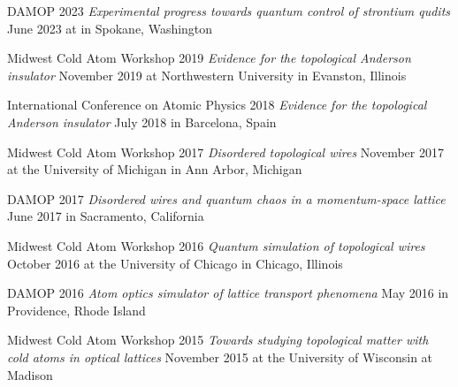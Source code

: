 \documentclass[12pt,letterpaper,sans]{moderncv}
\begin{document}
\begin{etaremune}[topsep=0pt,itemsep=4pt,partopsep=0pt,parsep=0pt]

\item DAMOP 2023
\newline
\emph{Experimental progress towards quantum control of strontium qudits}
\newline
June 2023 at in Spokane, Washington

\item Midwest Cold Atom Workshop 2019
\newline
\emph{Evidence for the topological Anderson insulator}
\newline
November 2019 at Northwestern University in Evanston, Illinois

\item International Conference on Atomic Physics 2018
\newline
\emph{Evidence for the topological Anderson insulator}
\newline
July 2018 in Barcelona, Spain

\item Midwest Cold Atom Workshop 2017
\newline
\emph{Disordered topological wires}
\newline
November 2017 at the University of Michigan in Ann Arbor, Michigan

\item DAMOP 2017
\newline
\emph{Disordered wires and quantum chaos in a momentum-space lattice}
\newline
June 2017 in Sacramento, California

\item Midwest Cold Atom Workshop 2016
\newline
\emph{Quantum simulation of topological wires}
\newline
October 2016 at the University of Chicago in Chicago, Illinois

\item DAMOP 2016
\newline
\emph{Atom optics simulator of lattice transport phenomena}
\newline
May 2016 in Providence, Rhode Island

\item Midwest Cold Atom Workshop 2015
\newline
\emph{Towards studying topological matter with cold atoms in optical lattices}
\newline
November 2015 at the University of Wisconsin at Madison

\end{etaremune}
\end{document}
